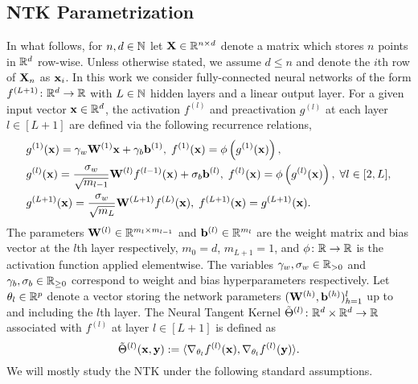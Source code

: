 \subsection{NTK Parametrization} 
In what follows, for $n,d\in \mathbb{N}$ let $\mathbf{X} \in \mathbb{R}^{n \times d}$ denote a matrix which stores $n$ points in $\mathbb{R}^d$ row-wise. Unless otherwise stated, we assume $d \leq n$ and denote the $i$th row of $\mathbf{X}_n$ as $\mathbf x_i$. In this work we consider fully-connected neural networks of the form $f^{(L+1)}\colon \mathbb{R}^d \rightarrow \mathbb{R}$ with $L \in \mathbb{N}$ hidden layers and a linear output layer. For a given input vector $\mathbf x \in \mathbb{R}^d$, the activation $f^{(l)}$ and preactivation $g^{(l)}$ at each layer $l \in [L+1]$ are defined via the following recurrence relations, 
\begin{equation}\label{eq:ffnn}
    \begin{aligned}
    &g^{(1)}(\mathbf x) = \gamma_w \mathbf{W}^{(1)}\mathbf x + \gamma_b\mathbf b^{(1)}, \; f^{(1)}(\mathbf x) = \phi \left( g^{(1)} (\mathbf x) \right),\\
    &g^{(l)}(\mathbf x) = \frac{\sigma_w}{\sqrt{m_{l-1}}} \mathbf{W}^{(l)} f^{(l-1)}(\mathbf x) + \sigma_b\mathbf b^{(l)}, \; f^{(l)}(\mathbf x) = \phi \left( g^{(l)} (\mathbf x) \right), \; \forall l \in [2,L],\\
    &g^{(L+1)}(\mathbf x) =  \frac{\sigma_w}{\sqrt{m_L}}\mathbf{W}^{(L+1)}f^{(L)}(\mathbf x), \; f^{(L+1)}(\mathbf x) = g^{(L+1)}(\mathbf x). 
    \end{aligned}
\end{equation}
The parameters $\mathbf{W}^{(l)} \in \mathbb{R}^{m_l \times m_{l-1}}$ and $\mathbf b^{(l)} \in \mathbb{R}^{m_l}$ are the weight matrix and bias vector at the $l$th layer respectively, $m_0 = d$, $m_{L+1} = 1$, and $\phi\colon \mathbb{R} \rightarrow \mathbb{R}$ is the activation function applied elementwise. The variables $\gamma_w, \sigma_w \in \mathbb{R}_{>0}$ and $\gamma_b, \sigma_b \in \mathbb{R}_{\geq0}$ correspond to weight and bias hyperparameters respectively.
Let $\theta_l \in \mathbb{R}^p$ denote a vector storing the network parameters $(\mathbf{W}^{(h)}, \mathbf b^{(h)})_{h=1}^{l}$ up to and including the $l$th layer. The Neural Tangent Kernel \citep{jacot_ntk} $\tilde{\Theta}^{(l)}\colon \mathbb{R}^d \times \mathbb{R}^d \rightarrow \mathbb{R}$ associated with $f^{(l)}$ at layer $l \in [L+1]$ is defined as
\begin{equation} \label{eq:ntk}
    \tilde{\Theta}^{(l)}(\mathbf x, \mathbf y) := \langle \nabla_{\theta_l} f^{(l)}(\mathbf x), \nabla_{\theta_l} f^{(l)}(\mathbf y) \rangle. 
\end{equation}
We will mostly study the NTK under the following standard assumptions.
